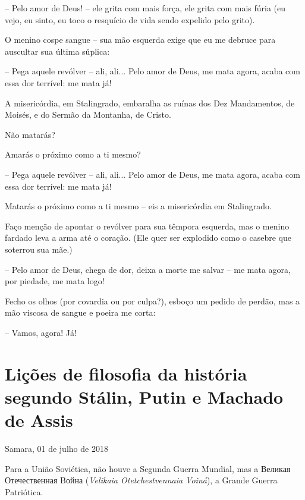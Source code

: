 -- Pelo amor de Deus! -- ele grita com mais força, ele grita com mais
fúria (eu vejo, eu sinto, eu toco o resquício de vida sendo expelido
pelo grito).

O menino cospe sangue -- sua mão esquerda exige que eu me debruce para
auscultar sua última súplica:

-- Pega aquele revólver -- ali, ali... Pelo amor de Deus, me mata agora,
acaba com essa dor terrível: me mata já!

A misericórdia, em Stalingrado, embaralha as ruínas dos Dez Mandamentos,
de Moisés, e do Sermão da Montanha, de Cristo.

Não matarás?

Amarás o próximo como a ti mesmo?

-- Pega aquele revólver -- ali, ali... Pelo amor de Deus, me mata agora,
acaba com essa dor terrível: me mata já!

Matarás o próximo como a ti mesmo -- eis a misericórdia em Stalingrado.

Faço menção de apontar o revólver para sua têmpora esquerda, mas o
menino fardado leva a arma até o coração. (Ele quer ser explodido como o
casebre que soterrou sua mãe.)

-- Pelo amor de Deus, chega de dor, deixa a morte me salvar -- me mata
agora, por piedade, me mata logo!

Fecho os olhos (por covardia ou por culpa?), esboço um pedido de perdão,
mas a mão viscosa de sangue e poeira me corta:

-- Vamos, agora! Já!

\chapter*{Lições de filosofia da história segundo Stálin, Putin e Machado de Assis}

\begin{flushright}
Samara, 01 de julho de 2018
\end{flushright}

Para a União Soviética, não houve a Segunda Guerra Mundial, mas a
Великая Отечественная Bойна (\emph{Velikaia Otetchestvennaia Voiná}), a
Grande Guerra Patriótica.

